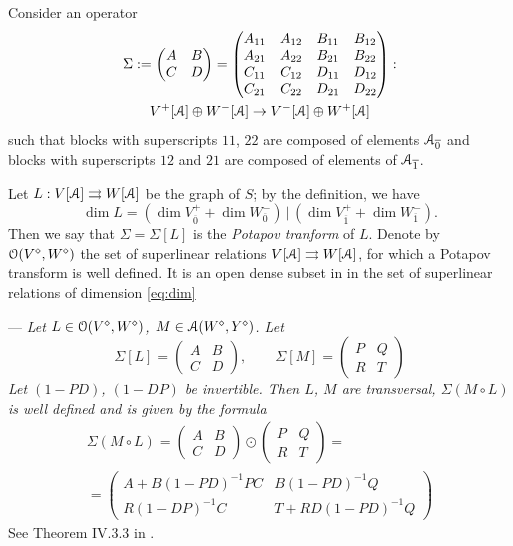 \documentclass[]{amsart}
\def\cA{\EuScript A}
\def\cO{\EuScript O}
\def\R {{\mathbb R }}
\def\C {{\mathbb C }}
\def\ov{\overline}
\def\sm{\smallskip}
\def\0{{\ov 0}}
\def\1{{\ov 1}}
\begin{document}
Consider an operator 
\begin{multline}
	\Sigma:=\begin{pmatrix}A&B\\C&D\end{pmatrix}
	= \begin{pmatrix}
		A_{11}&A_{12}&B_{11}&B_{12}\\
		A_{21}&A_{22}&B_{21}&B_{22}\\	
		C_{11}&C_{12}&D_{11}&D_{12}\\
		C_{21}&C_{22}&D_{21}&D_{22}
	\end{pmatrix}:\\
	V^+[\cA]\oplus W^-[\cA]\to V^-[\cA]\oplus W^+[\cA]
	\label{eq:potapov}
\end{multline}
such that blocks with superscripts $11$, $22$ are composed of elements $\cA_\0$ and blocks 
with superscripts $12$ and $21$ are composed of elements of $\cA_\1$.

Let $L:V[\cA]\tto W[\cA]$  be the graph of $S$; by the definition,
we have
\begin{equation}
	\dim L=(\dim V_\0^+ +\dim W_\0^-)\,\bigr|\, (\dim V_\1^+ +\dim W_\1^-).
	\label{eq:dim}
\end{equation}
Then we say that $\Sigma=\Sigma[L]$ is the 
{\it Potapov tranform} of $L$.  
Denote by $\cO(V^\diamond,W^\diamond)$ the set of superlinear relations $V[\cA]\tto W[\cA]$,
for which a Potapov transform is well defined. It is an open dense subset in 
in the set of superlinear relations of dimension \eqref{eq:dim}

\sm

--- {\it Let $L\in \cO(V^\diamond,W^\diamond)$, $M\in \cA(W^\diamond,Y^\diamond)$.
	Let
	$$
	\Sigma[L]=\begin{pmatrix}
		A&B\\C&D
	\end{pmatrix}, \qquad \Sigma[M]=\begin{pmatrix}
		P&Q\\R&T
	\end{pmatrix}
	$$
	Let   $(1-PD)$, $(1-DP)$ be  invertible.
	Then $L$, $M$ are transversal, $\Sigma(M\circ L)$ is well defined
	and is given by the formula
	\begin{multline}
		\Sigma(M\circ L)= \begin{pmatrix}
			A&B\\C&D
		\end{pmatrix} \odot 	\begin{pmatrix}
			P&Q\\R&T
		\end{pmatrix}
		= \\ =
		\begin{pmatrix}
			A+B(1-PD)^{-1}PC& B(1-PD)^{-1}Q\\
			R(1-DP)^{-1} C& T+RD(1-PD)^{-1}Q
		\end{pmatrix}
		\label{eq:PiPi}
	\end{multline}
} See Theorem IV.3.3 in \cite{Ner-book}.
\end{document}
